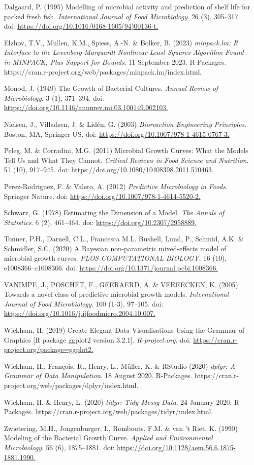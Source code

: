 \documentclass[11pt]{article}
\begin{document}
 Dalgaard, P. (1995) Modelling of microbial activity and prediction of shelf life for packed fresh fish. \textit{International Journal of Food Microbiology}. 26 (3), 305–317. doi: \url{https://doi.org/10.1016/0168-1605(94)00136-t.}

 Elzhov, T.V., Mullen, K.M., Spiess, A.-N. \& Bolker, B. (2023) \textit{minpack.lm: R Interface to the Levenberg-Marquardt Nonlinear Least-Squares Algorithm Found in MINPACK, Plus Support for Bounds}. 11 September 2023. R-Packages. {https://cran.r-project.org/web/packages/minpack.lm/index.html}.

 Monod, J. (1949) The Growth of Bacterial Cultures. \textit{Annual Review of Microbiology}. 3 (1), 371–394. doi: \url{https://doi.org/10.1146/annurev.mi.03.100149.002103.}

 Nielsen, J., Villadsen, J. \& Lidén, G. (2003) \textit{Bioreaction Engineering Principles}. Boston, MA, Springer US. doi: \url{https://doi.org/10.1007/978-1-4615-0767-3.}

 Peleg, M. \& Corradini, M.G. (2011) Microbial Growth Curves: What the Models Tell Us and What They Cannot. \textit{Critical Reviews in Food Science and Nutrition}. 51 (10), 917–945. 
 doi: \url{https://doi.org/10.1080/10408398.2011.570463.}

 Perez-Rodriguez, F. \& Valero, A. (2012) \textit{Predictive Microbiology in Foods}. Springer Nature. doi: \url{https://doi.org/10.1007/978-1-4614-5520-2.}

 Schwarz, G. (1978) Estimating the Dimension of a Model. \textit{The Annals of Statistics}. 6 (2), 461–464. doi: \url{https://doi.org/10.2307/2958889.}

 Tonner, P.H., Darnell, C.L., Francesca M.L. Bushell, Lund, P., Schmid, A.K. \& Schmidler, S.C. (2020) A Bayesian non-parametric mixed-effects model of microbial growth curves. \textit{PLOS COMPUTATIONAL BIOLOGY}. 16 (10), e1008366–e1008366. doi: \url{https://doi.org/10.1371/journal.pcbi.1008366.}

 VANIMPE, J., POSCHET, F., GEERAERD, A. \& VEREECKEN, K. (2005) Towards a novel class of predictive microbial growth models. \textit{International Journal of Food Microbiology}. 100 (1-3), 97–105. doi: \url{https://doi.org/10.1016/j.ijfoodmicro.2004.10.007.}

 Wickham, H. (2019) Create Elegant Data Visualisations Using the Grammar of Graphics [R package ggplot2 version 3.2.1]. \textit{R-project.org}. doi: \url{https://cran.r-project.org/package=ggplot2.}

 Wickham, H., François, R., Henry, L., Müller, K. \& RStudio (2020) \textit{dplyr: A Grammar of Data Manipulation}. 18 August 2020. R-Packages. {https://cran.r-project.org/web/packages/dplyr/index.html}.

 Wickham, H. \& Henry, L. (2020) \textit{tidyr: Tidy Messy Data}. 24 January 2020. R-Packages. {https://cran.r-project.org/web/packages/tidyr/index.html}.

 Zwietering, M.H., Jongenburger, I., Rombouts, F.M. \& van ’t Riet, K. (1990) Modeling of the Bacterial Growth Curve. \textit{Applied and Environmental Microbiology}. 56 (6), 1875–1881. doi: \url{https://doi.org/10.1128/aem.56.6.1875-1881.1990.}

 
\end{document}
